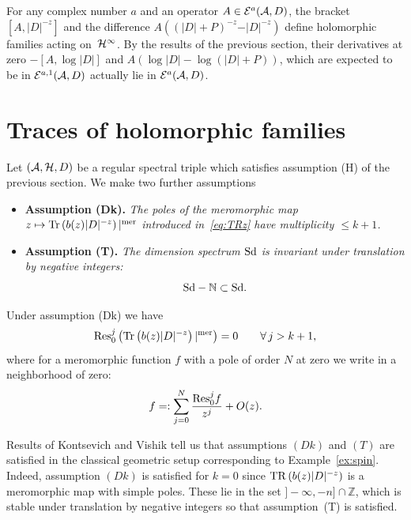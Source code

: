 \documentclass[pdftex]{sigma}
\def \Z {\mathbb Z}
\def \N {\mathbb N}
\numberwithin{equation}{section}
\begin{document}
{\sloppy
\begin{example}\label{ex:differencelog}  For any complex number $a$ and an  operator $A\in {\cal E}^a({\cal A}, D)$,  the bracket $[A, \vert D\vert^{-z}]$ and
 the dif\/ference
 $A  \left((\vert D\vert +P)^{-z}-\vert D\vert^{-z }\right)$
  def\/ine holomorphic families acting on~${\cal H}^\infty$.
  By the results of the previous section, their derivatives at zero
   $-[A,\log \vert D\vert]$ and
   $A  \left(\log \vert D\vert -\log \left(\vert D\vert +P\right)\right)$, which are
    expected to be in $ {\cal E}^{a,1}({\cal A}, D)$ actually lie in
    $ {\cal E}^{a}({\cal A}, D)$.
\end{example}

}

\section{Traces of holomorphic families}\label{section5}

Let $\left({\cal A}, {\cal H}, D\right)$ be a regular spectral triple which
satisf\/ies assumption (H)  of the previous section. We  make two  further
assumptions\begin{itemize}
\item\itemsep=0pt
{\bf Assumption (Dk).} {\it  The poles of the meromorphic map $z\mapsto  {\rm Tr}\left(b(z) \vert
    D\vert^{-z}\right)\vert^{\rm mer} $ introduced in~\eqref{eq:TRz}
have  multiplicity $\leq  k+1$.}
\item {\bf Assumption (T).} {\it  The dimension spectrum ${\rm Sd}$ is
    invariant under translation by negative integers:}
    \[
    {\rm Sd}-\N \subset {\rm Sd}.
\]
\end{itemize}

\begin{remark} Under assumption (Dk) we have
\[
{\rm Res}^j_0 \left(  {\rm Tr}\left(b(z) \vert
    D\vert^{-z}\right)\vert^{\rm mer}\right)= 0\qquad \forall\, j> k+1,
\]
 where for
    a meromorphic function $f$ with a pole of order $N$ at zero we write in a
    neighborhood of zero:
\[
f=:\sum_{j=0}^N  \frac{{\rm Res}_0^j f}{z^j}+ O(z).
\]
\end{remark}

\begin{example} Results of Kontsevich and Vishik \cite{KV} tell us that assumptions $(Dk)$ and
  $(T)$ are satisf\/ied in the classical geometric setup   corresponding to
    Example~\ref{ex:spin}. Indeed, assumption  $(Dk)$  is satisf\/ied for $k=0$ since ${\rm
    TR}\left(b(z)  \vert D\vert^{-z}\right)$ is a meromorphic map
  with simple poles. These lie  in the set $]{-}\infty , -n]\cap
  \Z$, which is stable under translation by negative integers so that
  assumption~(T) is satisf\/ied.
\end{example}
\end{document}
